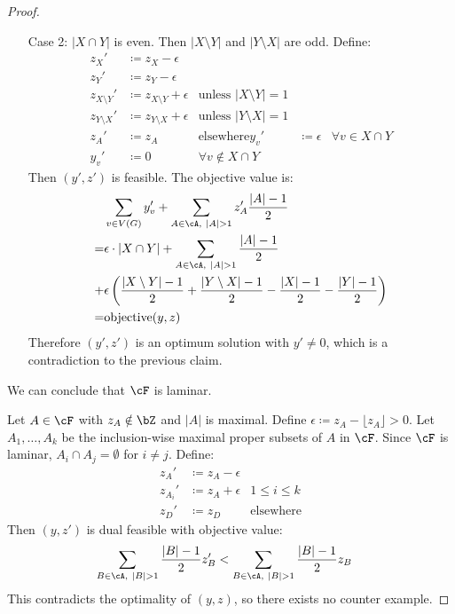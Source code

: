 \documentclass[11pt, a4paper]{article}
\newcommand{\floor}[1]{\lfloor #1 \rfloor}
\newcommand{\abs}[1]{\left\lvert#1\right\rvert}
\theoremstyle{remark}
\theoremstyle{definition}
\begin{document}
\begin{proof}
\begin{enumerate}
		\item[Case 2:] $\abs{X\cap Y}$ is even. Then $\abs{X\setminus Y}$ and
		$\abs{Y\setminus X}$ are odd. Define:
		\begin{align*}
			z_X'              & \coloneqq z_X-\epsilon                                         \\
			z_Y'              & \coloneqq z_Y-\epsilon                                         \\
			z_{X\setminus Y}' & \coloneqq z_{X\setminus Y}+\epsilon
			                  & \text{unless $\abs{X\setminus Y}=1$}                           \\
			z_{Y\setminus X}' & \coloneqq z_{Y\setminus X}+\epsilon
			                  & \text{unless $\abs{Y\setminus X}=1$}                           \\
			z_{A}'            & \coloneqq z_A                        & \text{elsewhere}
			y_v'              & \coloneqq \epsilon                   & \forall v\in X\cap Y    \\
			y_v'              & \coloneqq 0                          & \forall v\notin X\cap Y
		\end{align*}
		Then $(y',z')$ is feasible. The objective value is:
		\begin{align*}
			  & \sum_{v\in V(G)}y_v'
			+\sum_{A\in\cA,\ \abs{A}>1}z_A'\frac{\abs{A}-1}{2} \\
			= & \epsilon\cdot\abs{X\cap Y}
			+\sum_{A\in\cA,\ \abs{A}>1}\frac{\abs{A}-1}{2}     \\
			+ & \epsilon\left(\frac{\abs{X\setminus Y}-1}{2}
			+\frac{\abs{Y\setminus X}-1}{2}-\frac{\abs{X}-1}{2}
			-\frac{\abs{Y}-1}{2}\right)                        \\
			= & \mathrm{objective}(y,z)
		\end{align*}
		Therefore $(y',z')$ is an optimum solution with $y'\neq0$, which is
		a contradiction to the previous claim.
	\end{enumerate}
	We can conclude that $\cF$ is laminar.

	Let $A\in\cF$ with $z_A\notin\bZ$ and $\abs{A}$ is maximal. Define
	$\epsilon\coloneqq z_A-\floor{z_A}>0$. Let $A_1,\ldots,A_k$ be the
	inclusion-wise maximal proper subsets of $A$ in $\cF$. Since $\cF$ is
	laminar, $A_i\cap A_j=\emptyset$ for $i\neq j$. Define:
	\begin{align*}
		z_A'     & \coloneqq z_A-\epsilon                    \\
		z_{A_i}' & \coloneqq z_A+\epsilon & 1\leq i\leq k    \\
		z_D'     & \coloneqq z_D          & \text{elsewhere}
	\end{align*}
	Then $(y,z')$ is dual feasible with objective value:
	\begin{align*}
		\sum_{B\in\cA,\ \abs{B}>1}\frac{\abs{B}-1}{2}z_B'
		 & <\sum_{B\in\cA,\ \abs{B}>1}\frac{\abs{B}-1}{2}z_B
	\end{align*}
	This contradicts the optimality of $(y,z)$, so there exists no counter
	example.
\end{proof}
\end{document}
